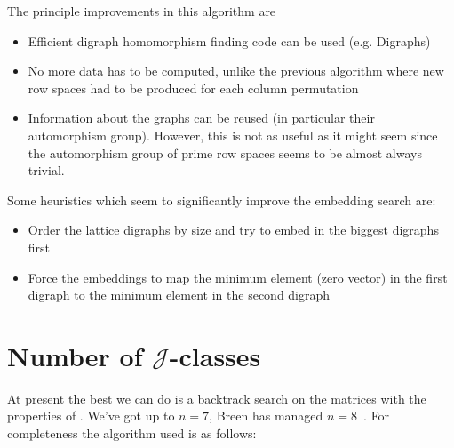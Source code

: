 \documentclass[11pt]{article}
\numberwithin{equation}{section}
\newcommand{\J}{\mathscr{J}}
\begin{document}
The principle improvements in this algorithm are
\begin{itemize}
  \item 
    Efficient digraph homomorphism finding code can be used (e.g. Digraphs)
  \item
    No more data has to be computed, unlike the previous algorithm where new row spaces had to be produced for each column permutation
  \item
    Information about the graphs can be reused (in particular their automorphism group). However, this is not as useful as it might seem since the automorphism group of prime row spaces seems to be almost always trivial.
\end{itemize}

Some heuristics which seem to significantly improve the embedding search are:

\begin{itemize}
  \item
    Order the lattice digraphs by size and try to embed in the biggest digraphs
    first
  \item
    Force the embeddings to map the minimum element (zero vector) in the first
    digraph to the minimum element in the second digraph
\end{itemize}

\section{Number of $\J$-classes}
At present the best we can do is a backtrack search on the matrices with the
properties of .
We've got up to $n = 7$, Breen has managed $n = 8$~\cite{Breen2001}.
For completeness the algorithm used is as follows:
\end{document}
